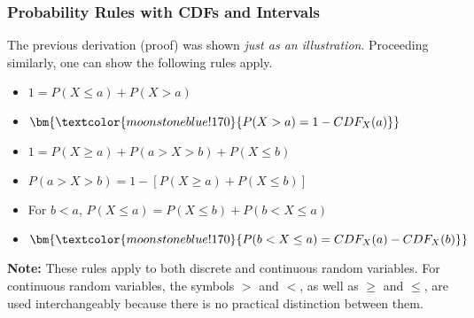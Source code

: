 \documentclass[handout]{beamer} %
\begin{document}
\begin{frame}
\frametitle{Probability Rules with CDFs and Intervals}

The previous derivation (proof) was shown \emph{just as an illustration}. Proceeding similarly, one can show the following rules apply. 
\vspace{0.8em}
  \pause

\begin{itemize}
    \setlength{\itemsep}{5pt} %
  \item \( 1 = P(X \leq a) + P(X > a) \)
  \item \( \bm{\textcolor{moonstoneblue!170}{P(X > a) = 1 - CDF_X(a)}} \)
  \item \( 1 = P(X \geq  a) + P(a > X > b) + P(X \leq b) \)
  \item \( P(a > X > b) = 1 - [P(X \geq a) + P(X \leq b)] \)
  \item For $b<a$, \( P(X \leq  a) = P(X \leq  b) + P(b < X \leq  a) \)
  \item \(   \bm{\textcolor{moonstoneblue!170}{P(b < X \leq  a) = CDF_X(a) - CDF_X(b)}} \)
\end{itemize}
\vspace{0.7em}
  \pause
\footnotesize 
\textbf{Note:} These rules apply to both discrete and continuous random variables. \textcolor{moonstoneblue!170}{For continuous random variables, the symbols \(>\) and \(<\), as well as \(\geq\) and \(\leq\), are used interchangeably because there is no practical distinction between them}.

\end{frame}
\end{document}
